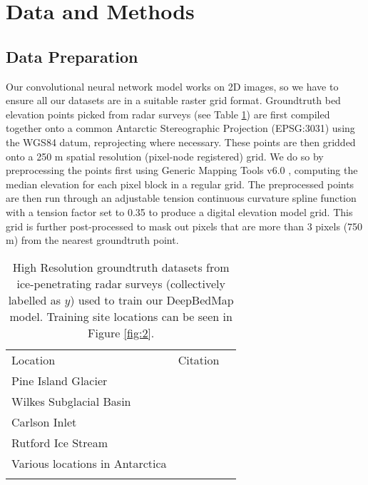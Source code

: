 \documentclass[tc, manuscript]{copernicus}
\begin{document}
\section{Data and Methods}

\subsection{Data Preparation} \label{section:datapreparation}

Our convolutional neural network model works on 2D images, so we have to ensure all our datasets are in a suitable raster grid format.
Groundtruth bed elevation points picked from radar surveys (see Table \ref{table:groundtruthdata}) are first compiled together onto a common Antarctic Stereographic Projection (EPSG:3031) using the WGS84 datum, reprojecting where necessary.
These points are then gridded onto a 250 m spatial resolution (pixel-node registered) grid.
We do so by preprocessing the points first using Generic Mapping Tools v6.0 \citep[GMT6,][]{WesselGenericMappingTools2019}, computing the median elevation for each pixel block in a regular grid.
The preprocessed points are then run through an adjustable tension continuous curvature spline function with a tension factor set to 0.35 to produce a digital elevation model grid.
This grid is further post-processed to mask out pixels that are more than 3 pixels (750 m) from the nearest groundtruth point.


\begin{table}[htbp]
  \caption{
    High Resolution groundtruth datasets from ice-penetrating radar surveys (collectively labelled as $y$) used to train our DeepBedMap model.
    Training site locations can be seen in Figure \ref{fig:2}.
  }
  \label{table:groundtruthdata}
  \begin{tabular}{lcr}
  \tophline
  Location & Citation \\
  \middlehline
  Pine Island Glacier & \cite{BinghamDiverselandscapesPine2017} \\
  Wilkes Subglacial Basin & \cite{JordanHypothesismegaoutburstflooding2010} \\
  Carlson Inlet & \cite{KingIcestreamnot2011} \\
  Rutford Ice Stream & \cite{KingSubglaciallandformsRutford2016} \\
  Various locations in Antarctica & \cite{ShiMultichannelCoherentRadar2010} \\
  \bottomhline
  \end{tabular}
  \belowtable{} %
\end{table}
\end{document}
